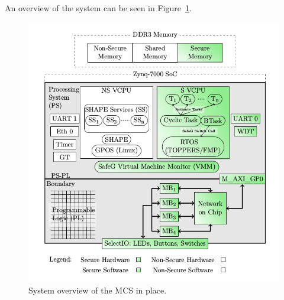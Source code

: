 An overview of the system can be seen in Figure~\ref{fig:introduction_overview}.

\begin{figure}[H]
\centering
\includegraphics[width=\textwidth]{./img/introduction_overview.png}
\caption{System overview of the MCS in place.\cite{zaki2016}}\label{fig:introduction_overview}
\end{figure}





